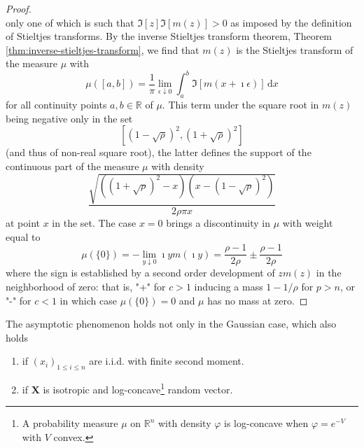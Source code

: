\begin{proof}
\begin{equation*}
    \end{equation*}
    only one of which is such that $\Im[z]\Im[m(z)]>0$ as imposed by the definition of Stieltjes transforms. By the inverse Stieltjes transform theorem, Theorem \ref{thm:inverse-stieltjes-transform}, we find that $m(z)$ is the Stieltjes transform of the measure $\mu$ with
    \begin{equation*}
        \mu([a,b])=\frac{1}{\pi}\lim_{\epsilon\downarrow 0}\int_{a}^{b}\Im[m(x+\imath\epsilon)]\,\mathrm{d}x
    \end{equation*}
    for all continuity points $a,b\in\mathbb{R}$ of $\mu$. This term under the square root in $m(z)$ being negative only in the set
    \begin{equation*}
        \left[(1-\sqrt{\rho})^{2},(1+\sqrt{\rho})^{2}\right]
    \end{equation*}
    (and thus of non-real square root), the latter defines the support of the continuous part of the measure $\mu$ with density
    \begin{equation*}
        \frac{\sqrt{\left((1+\sqrt{\rho})^{2}-x\right)\left(x-(1-\sqrt{\rho})^{2}\right)}}{2\rho\pi x}
    \end{equation*}
    at point $x$ in the set. The case $x=0$ brings a discontinuity in $\mu$ with weight equal to
    \begin{equation*}
        \mu(\{0\})=-\lim_{y\downarrow 0}\imath ym(\imath y)=\frac{\rho-1}{2\rho}\pm\frac{\rho-1}{2\rho}
    \end{equation*}
    where the sign is established by a second order development of $z m(z)$ in the neighborhood of zero: that is, "+" for $c>1$ inducing a mass $1-1/\rho$ for $p>n$, or "-" for $c<1$ in which case $\mu(\{0\})=0$ and $\mu$ has no mass at zero.
\end{proof}

\begin{remark}
    The asymptotic phenomenon holds not only in the Gaussian case, which also holds
    \begin{enumerate}
        \item if $\left(x_{i}\right)_{1\leq i\leq n}$ are i.i.d. with finite second moment.
        \item if $\mathbf{X}$ is isotropic and log-concave\footnote{A probability measure $\mu$ on $\mathbb{R}^{n}$ with density $\varphi$ is log-concave when $\varphi=e^{-V}$ with $V$ convex.} random vector.
    \end{enumerate}
\end{remark}

